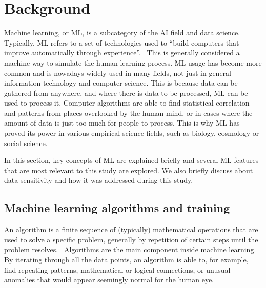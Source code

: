 

\section{Background}\label{sec:background}

Machine learning, or ML,
is a subcategory of the AI field and data science.
Typically, ML refers to
a set of technologies used to \enquote{build computers
that improve automatically through experience}.~\cite{jordan2015machine}
This is generally considered a machine way
to simulate the human learning process.
ML usage has become more common
and is nowadays widely used in many fields,
not just in general information technology and computer science.
This is because data can be gathered from anywhere,
and where there is data to be processed,
ML can be used to process it.
Computer algorithms are able to find 
statistical correlation and patterns
from places overlooked by the human mind,
or in cases where the amount of data is just too much
for people to process.
This is why ML has proved its power
in various empirical science fields,
such as biology, cosmology or social science.~\cite{jordan2015machine}

In this section, 
key concepts of ML are explained briefly
and several ML features
that are most relevant to this study
are explored.
We also briefly discuss about data sensitivity
and how it was addressed during this study.



\subsection{Machine learning algorithms and training}\label{subsec:bg-machine-learning}

An algorithm is a finite sequence of (typically) mathematical operations
that are used to solve a specific problem,
generally by repetition of certain steps
until the problem resolves.~\cite{merriam2022algorithm}
Algorithms are the main component inside machine learning.
By iterating through all the data points,
an algorithm is able to, for example,
find repeating patterns,
mathematical or logical connections,
or unusual anomalies that would appear seemingly normal for the human eye.

